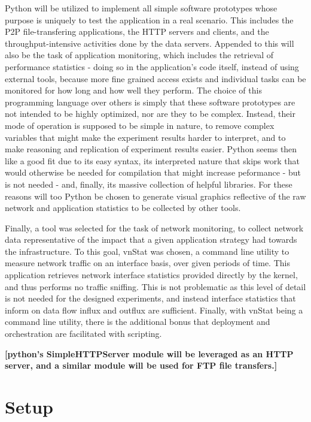     Python \cite{python} will be utilized to implement all simple software prototypes whose purpose is uniquely to test the application in a real scenario.
    This includes the P2P file-transfering applications, the HTTP servers and clients, and the throughput-intensive activities done by the data servers.
    Appended to this will also be the task of application monitoring, which includes the retrieval of performance statistics - doing so in the application's code itself, instead of using external tools, because more fine grained access exists and individual tasks can be monitored for how long and how well they perform.
    The choice of this programming language over others is simply that these software prototypes are not intended to be highly optimized, nor are they to be complex.
    Instead, their mode of operation is supposed to be simple in nature, to remove complex variables that might make the experiment results harder to interpret, and to make reasoning and replication of experiment results easier.
    Python seems then like a good fit due to its easy syntax, its interpreted nature that skips work that would otherwise be needed for compilation that might increase peformance - but is not needed - and, finally, its massive collection of helpful libraries.
    For these reasons will too Python be chosen to generate visual graphics reflective of the raw network and application statistics to be collected by other tools.

    Finally, a tool was selected for the task of network monitoring, to collect network data representative of the impact that a given application strategy had towards the infrastructure.
    To this goal, vnStat \cite{vnstat} was chosen, a command line utility to measure network traffic on an interface basis, over given periods of time.
    This application retrieves network interface statistics provided directly by the kernel, and thus performs no traffic sniffing.
    This is not problematic as this level of detail is not needed for the designed experiments, and instead interface statistics that inform on data flow influx and outflux are sufficient.
    Finally, with vnStat being a command line utility, there is the additional bonus that deployment and orchestration are facilitated with scripting.

    \textbf{[python's SimpleHTTPServer module will be leveraged as an HTTP server, and a similar module will be used for FTP file transfers.]}

\section{Setup}

